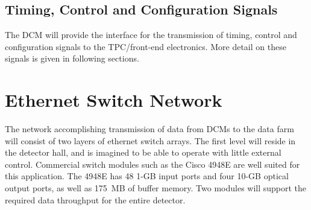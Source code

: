 %

\subsection{Timing, Control and Configuration Signals}

The DCM will provide the interface for the transmission of 
timing, control and configuration signals to the TPC/front-end electronics.
More detail on these signals is given in following sections.

\section{Ethernet Switch Network}
\label{sec:v5-trig-switch}

The network accomplishing transmission of data from DCMs to the data 
farm will consist of two layers of ethernet switch arrays.  
The first level will reside in the detector hall, and is imagined to be 
able to operate with little external control.  Commercial switch modules 
such as the Cisco 4948E are well suited for this application.  The 4948E 
has 48 1-GB input ports and four 10-GB optical output ports, 
as well as 175~MB of buffer memory.  Two modules will support the 
required data throughput for the entire detector.

